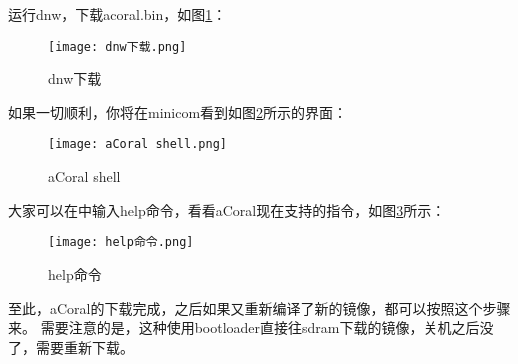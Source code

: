 运行dnw，下载acoral.bin，如图\ref{dnw下载}：
\begin{figure}[H]
	\texttt{[image: dnw下载.png]}
	\caption{dnw下载}
	\label{dnw下载}
\end{figure}

如果一切顺利，你将在minicom看到如图\ref{aCoral shell}所示的界面：
\begin{figure}[H]
	\texttt{[image: aCoral shell.png]}
	\caption{aCoral shell}
	\label{aCoral shell}
\end{figure}

大家可以在中输入help命令，看看aCoral现在支持的指令，如图\ref{help命令}所示：
\begin{figure}[H]
	\texttt{[image: help命令.png]}
	\caption{help命令}
	\label{help命令}
\end{figure}

至此，aCoral的下载完成，之后如果又重新编译了新的镜像，都可以按照这个步骤来。
需要注意的是，这种使用bootloader直接往sdram下载的镜像，关机之后没了，需要重新下载。